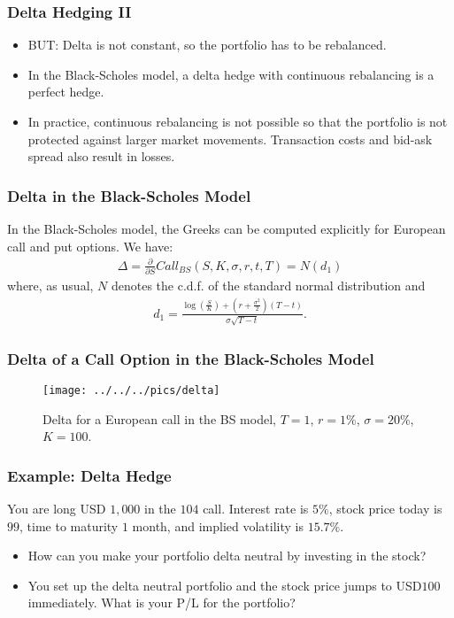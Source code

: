 \begin{frame}[fragile]
\frametitle{Delta Hedging II}
\begin{itemize}
  \item BUT: Delta is not constant, so the portfolio has to be rebalanced.
  \item In the Black-Scholes model, a delta hedge with continuous rebalancing is
  a perfect hedge.
  \item In practice, continuous rebalancing is not possible so that the
  portfolio is not protected against larger market movements. Transaction
  costs and bid-ask spread also result in losses.
\end{itemize}
\end{frame}



\begin{frame}[fragile]
\frametitle{Delta in the Black-Scholes Model}
In the Black-Scholes model, the Greeks can be computed explicitly for
European call and put options. We have:
\begin{align*}
  \Delta = \frac{\partial}{\partial S}Call_{BS}(S,K,\sigma,r,t,T) = N(d_1)
\end{align*}
where, as usual, $N$ denotes the c.d.f. of the standard normal distribution and
\begin{align*}
  d_1 = \frac{\log \left( \frac{S}{K} \right) + \left( r + \frac{\sigma^2}{2}
  \right)(T-t)}{\sigma \sqrt{T-t}}.
\end{align*}
\end{frame}

\begin{frame}[fragile]
\frametitle{Delta of a Call Option in the Black-Scholes Model}
\begin{figure}[htp]
\begin{center}
  \texttt{[image: ../../../pics/delta]}
  \caption{Delta for a European call in the BS model, $T=1$, $r=1\%$,
  $\sigma=20\%$, $K=100$.}
  \label{fig:deltaBS}
\end{center}
\end{figure}
\end{frame}

\begin{frame}[fragile]
\frametitle{Example: Delta Hedge}
You are long USD $1,000$ in the $104$ call. Interest rate is $5\%$,
stock price today is $99$, time to maturity $1$ month, and implied volatility is
$15.7\%$.
\begin{itemize}
  \item How can you make your portfolio delta neutral by investing in the stock?
  \item You set up the delta neutral portfolio and the stock price jumps to
  USD$100$ immediately. What is your P/L for the portfolio?
\end{itemize}

\end{frame}

